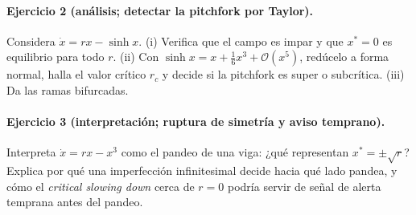 \paragraph{Ejercicio 2 (análisis; detectar la pitchfork por Taylor).} Considera $\dot{x}=rx-\sinh x$. (i) Verifica que el campo es impar y que $x^*=0$ es equilibrio para todo $r$. (ii) Con $\sinh x=x+\tfrac16 x^3+\mathcal{O}(x^5)$, redúcelo a forma normal, halla el valor crítico $r_c$ y decide si la pitchfork es super o subcrítica. (iii) Da las ramas bifurcadas.

\paragraph{Ejercicio 3 (interpretación; ruptura de simetría y aviso temprano).} Interpreta $\dot{x}=rx-x^3$ como el pandeo de una viga: ¿qué representan $x^*=\pm\sqrt{r}$? Explica por qué una imperfección infinitesimal decide hacia qué lado pandea, y cómo el \emph{critical slowing down} cerca de $r=0$ podría servir de señal de alerta temprana antes del pandeo.

